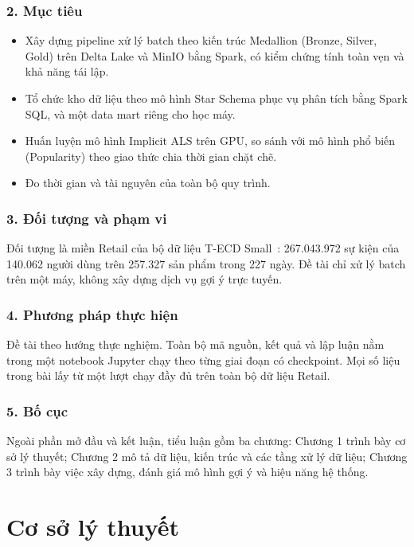 \documentclass[a4paper,12pt,oneside]{report}
\begin{document}
\subsection*{2. Mục tiêu}
\begin{itemize}
  \item Xây dựng pipeline xử lý batch theo kiến trúc Medallion (Bronze, Silver, Gold) trên Delta Lake và MinIO bằng Spark, có kiểm chứng tính toàn vẹn và khả năng tái lập.
  \item Tổ chức kho dữ liệu theo mô hình Star Schema phục vụ phân tích bằng Spark SQL, và một data mart riêng cho học máy.
  \item Huấn luyện mô hình Implicit ALS trên GPU, so sánh với mô hình phổ biến (Popularity) theo giao thức chia thời gian chặt chẽ.
  \item Đo thời gian và tài nguyên của toàn bộ quy trình.
\end{itemize}

\subsection*{3. Đối tượng và phạm vi}
Đối tượng là miền Retail của bộ dữ liệu T-ECD Small~\cite{tecd}: 267.043.972 sự kiện của 140.062 người dùng trên 257.327 sản phẩm trong 227 ngày. Đề tài chỉ xử lý batch trên một máy, không xây dựng dịch vụ gợi ý trực tuyến.

\subsection*{4. Phương pháp thực hiện}
Đề tài theo hướng thực nghiệm. Toàn bộ mã nguồn, kết quả và lập luận nằm trong một notebook Jupyter chạy theo từng giai đoạn có checkpoint. Mọi số liệu trong bài lấy từ một lượt chạy đầy đủ trên toàn bộ dữ liệu Retail.

\subsection*{5. Bố cục}
Ngoài phần mở đầu và kết luận, tiểu luận gồm ba chương: Chương 1 trình bày cơ sở lý thuyết; Chương 2 mô tả dữ liệu, kiến trúc và các tầng xử lý dữ liệu; Chương 3 trình bày việc xây dựng, đánh giá mô hình gợi ý và hiệu năng hệ thống.

\chapter{Cơ sở lý thuyết}
\end{document}
